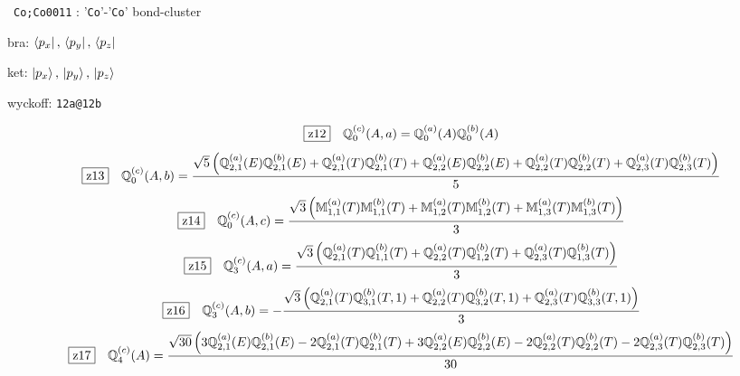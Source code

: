 \documentclass[fleqn,10pt,landscape]{jsarticle}
\begin{document}
\noindent\textbullet\, \texttt{Co;Co\texttt{}001\texttt{}1} : '\texttt{Co}'-'\texttt{Co}' bond-cluster

\noindent\quad * bra: $\bra{p_{x}},\, \bra{p_{y}},\, \bra{p_{z}}$

\noindent\quad * ket: $\ket{p_{x}},\, \ket{p_{y}},\, \ket{p_{z}}$

\noindent\quad * wyckoff: \texttt{12a@12b}

\begin{dmath*}
\hspace*{3mm}\fbox{z12}\quad \mathbb{Q}_{0}^{(c)}(A,a)=\mathbb{Q}_{0}^{(a)}(A) \mathbb{Q}_{0}^{(b)}(A)
\end{dmath*}
\begin{dmath*}
\hspace*{3mm}\fbox{z13}\quad \mathbb{Q}_{0}^{(c)}(A,b)=\frac{\sqrt{5} \left(\mathbb{Q}_{2,1}^{(a)}(E) \mathbb{Q}_{2,1}^{(b)}(E) + \mathbb{Q}_{2,1}^{(a)}(T) \mathbb{Q}_{2,1}^{(b)}(T) + \mathbb{Q}_{2,2}^{(a)}(E) \mathbb{Q}_{2,2}^{(b)}(E) + \mathbb{Q}_{2,2}^{(a)}(T) \mathbb{Q}_{2,2}^{(b)}(T) + \mathbb{Q}_{2,3}^{(a)}(T) \mathbb{Q}_{2,3}^{(b)}(T)\right)}{5}
\end{dmath*}
\begin{dmath*}
\hspace*{3mm}\fbox{z14}\quad \mathbb{Q}_{0}^{(c)}(A,c)=\frac{\sqrt{3} \left(\mathbb{M}_{1,1}^{(a)}(T) \mathbb{M}_{1,1}^{(b)}(T) + \mathbb{M}_{1,2}^{(a)}(T) \mathbb{M}_{1,2}^{(b)}(T) + \mathbb{M}_{1,3}^{(a)}(T) \mathbb{M}_{1,3}^{(b)}(T)\right)}{3}
\end{dmath*}
\begin{dmath*}
\hspace*{3mm}\fbox{z15}\quad \mathbb{Q}_{3}^{(c)}(A,a)=\frac{\sqrt{3} \left(\mathbb{Q}_{2,1}^{(a)}(T) \mathbb{Q}_{1,1}^{(b)}(T) + \mathbb{Q}_{2,2}^{(a)}(T) \mathbb{Q}_{1,2}^{(b)}(T) + \mathbb{Q}_{2,3}^{(a)}(T) \mathbb{Q}_{1,3}^{(b)}(T)\right)}{3}
\end{dmath*}
\begin{dmath*}
\hspace*{3mm}\fbox{z16}\quad \mathbb{Q}_{3}^{(c)}(A,b)=- \frac{\sqrt{3} \left(\mathbb{Q}_{2,1}^{(a)}(T) \mathbb{Q}_{3,1}^{(b)}(T,1) + \mathbb{Q}_{2,2}^{(a)}(T) \mathbb{Q}_{3,2}^{(b)}(T,1) + \mathbb{Q}_{2,3}^{(a)}(T) \mathbb{Q}_{3,3}^{(b)}(T,1)\right)}{3}
\end{dmath*}
\begin{dmath*}
\hspace*{3mm}\fbox{z17}\quad \mathbb{Q}_{4}^{(c)}(A)=\frac{\sqrt{30} \left(3 \mathbb{Q}_{2,1}^{(a)}(E) \mathbb{Q}_{2,1}^{(b)}(E) - 2 \mathbb{Q}_{2,1}^{(a)}(T) \mathbb{Q}_{2,1}^{(b)}(T) + 3 \mathbb{Q}_{2,2}^{(a)}(E) \mathbb{Q}_{2,2}^{(b)}(E) - 2 \mathbb{Q}_{2,2}^{(a)}(T) \mathbb{Q}_{2,2}^{(b)}(T) - 2 \mathbb{Q}_{2,3}^{(a)}(T) \mathbb{Q}_{2,3}^{(b)}(T)\right)}{30}
\end{dmath*}
\end{document}
